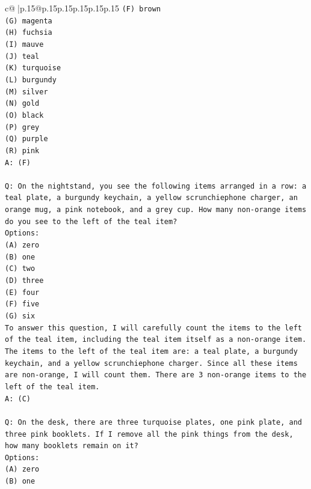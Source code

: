\documentclass{article}
\begin{document}
{\begin{supertabular}{c@{$\;$}|p{.15\linewidth}@{}p{.15\linewidth}p{.15\linewidth}p{.15\linewidth}p{.15\linewidth}p{.15\linewidth}}
{{{\texttt{(F) brown} \\
\texttt{(G) magenta} \\
\texttt{(H) fuchsia} \\
\texttt{(I) mauve} \\
\texttt{(J) teal} \\
\texttt{(K) turquoise} \\
\texttt{(L) burgundy} \\
\texttt{(M) silver} \\
\texttt{(N) gold} \\
\texttt{(O) black} \\
\texttt{(P) grey} \\
\texttt{(Q) purple} \\
\texttt{(R) pink} \\
\texttt{A: (F)} \\
\\ 
\texttt{Q: On the nightstand, you see the following items arranged in a row: a teal plate, a burgundy keychain, a yellow scrunchiephone charger, an orange mug, a pink notebook, and a grey cup. How many non{-}orange items do you see to the left of the teal item?} \\
\texttt{Options:} \\
\texttt{(A) zero} \\
\texttt{(B) one} \\
\texttt{(C) two} \\
\texttt{(D) three} \\
\texttt{(E) four} \\
\texttt{(F) five} \\
\texttt{(G) six} \\
\texttt{To answer this question, I will carefully count the items to the left of the teal item, including the teal item itself as a non{-}orange item. The items to the left of the teal item are: a teal plate, a burgundy keychain, and a yellow scrunchiephone charger. Since all these items are non{-}orange, I will count them. There are 3 non{-}orange items to the left of the teal item.} \\
\texttt{A: (C)} \\
\\ 
\texttt{Q: On the desk, there are three turquoise plates, one pink plate, and three pink booklets. If I remove all the pink things from the desk, how many booklets remain on it?} \\
\texttt{Options:} \\
\texttt{(A) zero} \\
\texttt{(B) one} \\
}}}
\end{supertabular}}
\end{document}
